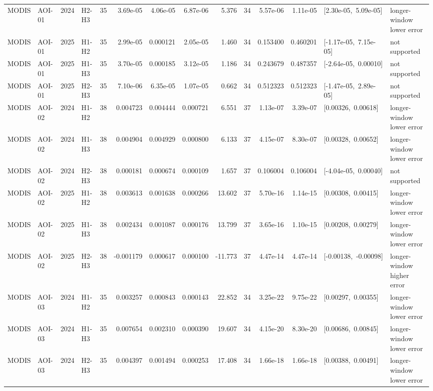 \begin{landscape}
\begin{longtable}{llclrrrrrrrrp{2.35cm}p{1.75cm}}
MODIS & AOI-01 & 2024 & H2-H3 & 35 & 3.69e-05 & 4.06e-05 & 6.87e-06 & 5.376 & 34 & 5.57e-06 & 1.11e-05 & \mbox{[2.30e-05, 5.09e-05]} & longer-window lower error \\
MODIS & AOI-01 & 2025 & H1-H2 & 35 & 2.99e-05 & 0.000121 & 2.05e-05 & 1.460 & 34 & 0.153400 & 0.460201 & \mbox{[-1.17e-05, 7.15e-05]} & not supported \\
MODIS & AOI-01 & 2025 & H1-H3 & 35 & 3.70e-05 & 0.000185 & 3.12e-05 & 1.186 & 34 & 0.243679 & 0.487357 & \mbox{[-2.64e-05, 0.00010]} & not supported \\
MODIS & AOI-01 & 2025 & H2-H3 & 35 & 7.10e-06 & 6.35e-05 & 1.07e-05 & 0.662 & 34 & 0.512323 & 0.512323 & \mbox{[-1.47e-05, 2.89e-05]} & not supported \\
MODIS & AOI-02 & 2024 & H1-H2 & 38 & 0.004723 & 0.004444 & 0.000721 & 6.551 & 37 & 1.13e-07 & 3.39e-07 & \mbox{[0.00326, 0.00618]} & longer-window lower error \\
MODIS & AOI-02 & 2024 & H1-H3 & 38 & 0.004904 & 0.004929 & 0.000800 & 6.133 & 37 & 4.15e-07 & 8.30e-07 & \mbox{[0.00328, 0.00652]} & longer-window lower error \\
MODIS & AOI-02 & 2024 & H2-H3 & 38 & 0.000181 & 0.000674 & 0.000109 & 1.657 & 37 & 0.106004 & 0.106004 & \mbox{[-4.04e-05, 0.00040]} & not supported \\
MODIS & AOI-02 & 2025 & H1-H2 & 38 & 0.003613 & 0.001638 & 0.000266 & 13.602 & 37 & 5.70e-16 & 1.14e-15 & \mbox{[0.00308, 0.00415]} & longer-window lower error \\
MODIS & AOI-02 & 2025 & H1-H3 & 38 & 0.002434 & 0.001087 & 0.000176 & 13.799 & 37 & 3.65e-16 & 1.10e-15 & \mbox{[0.00208, 0.00279]} & longer-window lower error \\
MODIS & AOI-02 & 2025 & H2-H3 & 38 & -0.001179 & 0.000617 & 0.000100 & -11.773 & 37 & 4.47e-14 & 4.47e-14 & \mbox{[-0.00138, -0.00098]} & longer-window higher error \\
MODIS & AOI-03 & 2024 & H1-H2 & 35 & 0.003257 & 0.000843 & 0.000143 & 22.852 & 34 & 3.25e-22 & 9.75e-22 & \mbox{[0.00297, 0.00355]} & longer-window lower error \\
MODIS & AOI-03 & 2024 & H1-H3 & 35 & 0.007654 & 0.002310 & 0.000390 & 19.607 & 34 & 4.15e-20 & 8.30e-20 & \mbox{[0.00686, 0.00845]} & longer-window lower error \\
MODIS & AOI-03 & 2024 & H2-H3 & 35 & 0.004397 & 0.001494 & 0.000253 & 17.408 & 34 & 1.66e-18 & 1.66e-18 & \mbox{[0.00388, 0.00491]} & longer-window lower error \\

\end{longtable}
\end{landscape}
